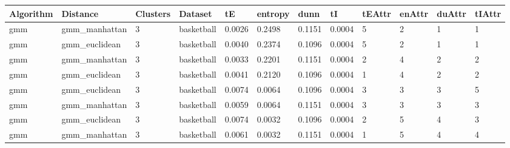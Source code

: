 \begin{itemize}
{\small
\begin{longtable}{| p{1cm} | p{1.8cm} | p{0.7cm} | p{0.9cm} | p{0.5cm} | p{0.65cm} | p{0.5cm} | p{0.5cm} | p{0.55cm} | p{0.55cm} | p{0.6cm} | p{0.5cm} |}
\hline
\scriptsize  Algorithm & \scriptsize  Distance  &  \scriptsize Clusters & \scriptsize  Dataset & \scriptsize tE & \scriptsize entropy & \scriptsize  dunn  & \scriptsize tI & \scriptsize tEAttr & \scriptsize enAttr & \scriptsize duAttr & \scriptsize tIAttr  \\
\hline
\scriptsize gmm & \scriptsize gmm\_manhattan & \scriptsize 3 & \scriptsize basketball & \scriptsize 0.0026 & \scriptsize 0.2498 & \scriptsize 0.1151 & \scriptsize 0.0004 & \scriptsize 5 & \scriptsize 2 & \scriptsize 1 & \scriptsize 1 \\
\cline{2-12}
\scriptsize gmm & \scriptsize gmm\_euclidean & \scriptsize 3 & \scriptsize basketball & \scriptsize 0.0040 & \scriptsize 0.2374 & \scriptsize 0.1096 & \scriptsize 0.0004 & \scriptsize 5 & \scriptsize 2 & \scriptsize 1 & \scriptsize 1 \\
\cline{2-12}
\scriptsize gmm & \scriptsize gmm\_manhattan & \scriptsize 3 & \scriptsize basketball & \scriptsize 0.0033 & \scriptsize 0.2201 & \scriptsize 0.1151 & \scriptsize 0.0004 & \scriptsize 2 & \scriptsize 4 & \scriptsize 2 & \scriptsize 2 \\
\cline{2-12}
\scriptsize gmm & \scriptsize gmm\_euclidean & \scriptsize 3 & \scriptsize basketball & \scriptsize 0.0041 & \scriptsize 0.2120 & \scriptsize 0.1096 & \scriptsize 0.0004 & \scriptsize 1 & \scriptsize 4 & \scriptsize 2 & \scriptsize 2 \\
\cline{2-12}
\scriptsize gmm & \scriptsize gmm\_euclidean & \scriptsize 3 & \scriptsize basketball & \scriptsize 0.0074 & \scriptsize 0.0064 & \scriptsize 0.1096 & \scriptsize 0.0004 & \scriptsize 3 & \scriptsize 3 & \scriptsize 3 & \scriptsize 5 \\
\cline{2-12}
\scriptsize gmm & \scriptsize gmm\_manhattan & \scriptsize 3 & \scriptsize basketball & \scriptsize 0.0059 & \scriptsize 0.0064 & \scriptsize 0.1151 & \scriptsize 0.0004 & \scriptsize 3 & \scriptsize 3 & \scriptsize 3 & \scriptsize 3 \\
\cline{2-12}
\scriptsize gmm & \scriptsize gmm\_euclidean & \scriptsize 3 & \scriptsize basketball & \scriptsize 0.0074 & \scriptsize 0.0032 & \scriptsize 0.1096 & \scriptsize 0.0004 & \scriptsize 2 & \scriptsize 5 & \scriptsize 4 & \scriptsize 3 \\
\cline{2-12}
\scriptsize gmm & \scriptsize gmm\_manhattan & \scriptsize 3 & \scriptsize basketball & \scriptsize 0.0061 & \scriptsize 0.0032 & \scriptsize 0.1151 & \scriptsize 0.0004 & \scriptsize 1 & \scriptsize 5 & \scriptsize 4 & \scriptsize 4 \\

\end{longtable}}
\end{itemize}
